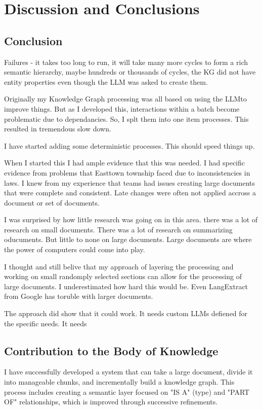 \chapter{Discussion and Conclusions}
\section{Conclusion}

Failures - it takes too long to run, it will take many more cycles to form a rich semantic hierarchy, maybe hundreds or thousands of cycles, the KG did not have entity properties even though the LLM was asked to create them.

Originally my Knowledge Graph processing was all based on using the LLMto improve things. But as I developed this, interactions within a batch become problematic due to dependancies. So, I splt them into one item processes. This resulted in tremendous slow down.

I have started adding some deterministic processes. This should speed things up.

When I started this I had ample evidence that this was needed. I had specific evidence from problems that Easttown township faced due to inconsistencies in laws. I knew from my experience that teams had issues creating large documents that were complete and consistent. Late changes were often not applied accross a document or set of documents.

I was surprised by how little research was going on in this area. there was a lot of research on small documents. There was a lot of research on summarizing oducuments. But little to none on large documents. Large documents are where the power of computers could come into play.

I thought and still belive that my approach of layering the processing and working on small randomply selected sections can allow for the processing of large documents. I underestimated how hard this would be. Even LangExtract from Google has toruble with larger documents.

The approach did show that it could work. It needs custom LLMs defiened for the specific needs. It needs

\section{Contribution to the Body of Knowledge}
I have successfully developed a system that can take a large document, divide it into manageable chunks, and incrementally build a knowledge graph. This process includes creating a semantic layer focused on "IS A" (type) and "PART OF" relationships, which is improved through successive refinements.

